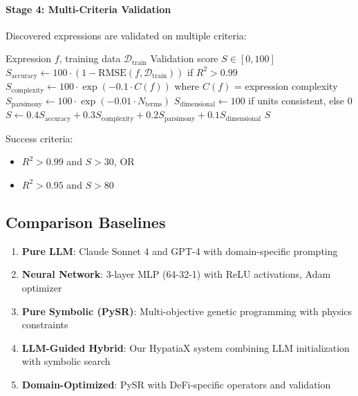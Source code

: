 \documentclass[twoside,11pt]{article}
\begin{document}
\paragraph{Stage 4: Multi-Criteria Validation}

Discovered expressions are validated on multiple criteria:

\begin{algorithm}[htbp]
\caption{Multi-Criteria Expression Validation}
\begin{algorithmic}[1]
\REQUIRE Expression $f$, training data $\mathcal{D}_{\text{train}}$
\ENSURE Validation score $S \in [0, 100]$
\STATE $S_{\text{accuracy}} \gets 100 \cdot (1 - \text{RMSE}(f, \mathcal{D}_{\text{train}}))$ if $R^2 > 0.99$
\STATE $S_{\text{complexity}} \gets 100 \cdot \exp(-0.1 \cdot C(f))$ where $C(f)$ = expression complexity
\STATE $S_{\text{parsimony}} \gets 100 \cdot \exp(-0.01 \cdot N_{\text{terms}})$
\STATE $S_{\text{dimensional}} \gets 100$ if units consistent, else $0$
\STATE $S \gets 0.4 S_{\text{accuracy}} + 0.3 S_{\text{complexity}} + 0.2 S_{\text{parsimony}} + 0.1 S_{\text{dimensional}}$
\RETURN $S$
\end{algorithmic}
\end{algorithm}

Success criteria:
\begin{itemize}
    \item $R^2 > 0.99$ and $S > 30$, OR
    \item $R^2 > 0.95$ and $S > 80$
\end{itemize}


\subsection{Comparison Baselines}

\begin{enumerate}
\item \textbf{Pure LLM}: Claude Sonnet 4 and GPT-4 with domain-specific prompting\citep{bubeck2023sparks}\citep{romera2023mathematical}\citep{kambhampati2024llms}
\item \textbf{Neural Network}: 3-layer MLP (64-32-1) with ReLU activations, Adam optimizer
\item \textbf{Pure Symbolic (PySR)}: Multi-objective genetic programming with physics constraints\citep{koza1994genetic}\citep{stephens2018gplearn}
\item \textbf{LLM-Guided Hybrid}: Our HypatiaX system combining LLM initialization with symbolic search\citep{kambhampati2024llms}
\item \textbf{Domain-Optimized}: PySR with DeFi-specific operators and validation
\end{enumerate}
\end{document}
